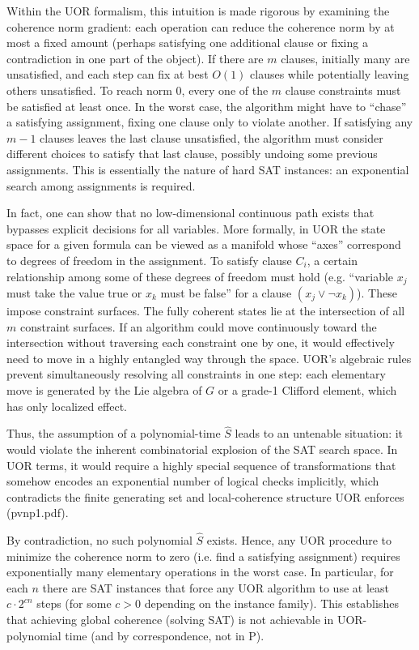 \documentclass{article}
\begin{document}
Within the UOR formalism, this intuition is made rigorous by examining the coherence norm gradient: each operation can reduce the coherence norm by at most a fixed amount (perhaps satisfying one additional clause or fixing a contradiction in one part of the object). If there are $m$ clauses, initially many are unsatisfied, and each step can fix at best $O(1)$ clauses while potentially leaving others unsatisfied. To reach norm $0$, every one of the $m$ clause constraints must be satisfied at least once. In the worst case, the algorithm might have to “chase” a satisfying assignment, fixing one clause only to violate another. If satisfying any $m-1$ clauses leaves the last clause unsatisfied, the algorithm must consider different choices to satisfy that last clause, possibly undoing some previous assignments. This is essentially the nature of hard SAT instances: an exponential search among assignments is required.

In fact, one can show that no low-dimensional continuous path exists that bypasses explicit decisions for all variables. More formally, in UOR the state space for a given formula can be viewed as a manifold whose “axes” correspond to degrees of freedom in the assignment. To satisfy clause $C_i$, a certain relationship among some of these degrees of freedom must hold (e.g. “variable $x_j$ must take the value true or $x_k$ must be false” for a clause $(x_j \vee \neg x_k)$). These impose constraint surfaces. The fully coherent states lie at the intersection of all $m$ constraint surfaces. If an algorithm could move continuously toward the intersection without traversing each constraint one by one, it would effectively need to move in a highly entangled way through the space. UOR’s algebraic rules prevent simultaneously resolving all constraints in one step: each elementary move is generated by the Lie algebra of $G$ or a grade-1 Clifford element, which has only localized effect.

Thus, the assumption of a polynomial-time $\hat{S}$ leads to an untenable situation: it would violate the inherent combinatorial explosion of the SAT search space. In UOR terms, it would require a highly special sequence of transformations that somehow encodes an exponential number of logical checks implicitly, which contradicts the finite generating set and local-coherence structure UOR enforces (pvnp1.pdf).

By contradiction, no such polynomial $\hat{S}$ exists. Hence, any UOR procedure to minimize the coherence norm to zero (i.e. find a satisfying assignment) requires exponentially many elementary operations in the worst case. In particular, for each $n$ there are SAT instances that force any UOR algorithm to use at least $c\cdot 2^{cn}$ steps (for some $c>0$ depending on the instance family). This establishes that achieving global coherence (solving SAT) is not achievable in UOR-polynomial time (and by correspondence, not in P).
\end{document}
